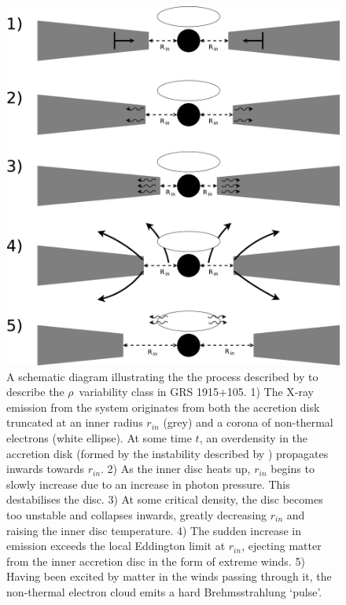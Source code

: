 \begin{figure}
  \centering
  \includegraphics[width=.9\linewidth, trim= 25mm 0mm 0mm 0mm]{images/Wind_Model1.eps}
  \caption[A schematic diagram illustrating the the process described by \citet{Neilsen_GRSModel} to describe the $\rho$ variability class in GRS 1915+105.]{A schematic diagram illustrating the the process described by \citealp{Neilsen_GRSModel} to describe the $\rho$\indexrho\ variability class in GRS 1915+105.  1) The X-ray emission from the system originates from both the accretion disk truncated at an inner radius $r_{in}$ (grey) and a corona of non-thermal electrons (white ellipse).  At some time $t$, an overdensity in the accretion disk (formed by the instability described by \citealp{Shakura_Instab}) propagates inwards towards $r_{in}$.  2) As the inner disc heats up, $r_{in}$ begins to slowly increase due to an increase in photon pressure.  This destabilises the disc.  3) At some critical density, the disc becomes too unstable and collapses inwards, greatly decreasing $r_{in}$ and raising the inner disc temperature.  4) The sudden increase in emission exceeds the local Eddington limit at $r_{in}$, ejecting matter from the inner accretion disc in the form of extreme winds.  5) Having been excited by matter in the winds passing through it, the non-thermal electron cloud emits a hard Brehmsstrahlung `pulse'.}
  \label{fig:WindsModel}
\end{figure}

